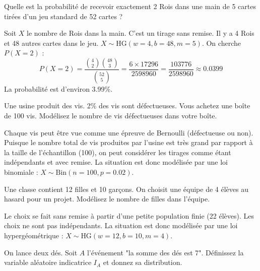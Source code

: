 \begin{exercicebox}
Quelle est la probabilité de recevoir exactement 2 Rois dans une main de 5 cartes tirées d'un jeu standard de 52 cartes ?
\end{exercicebox}

\begin{correctionbox}
Soit $X$ le nombre de Rois dans la main. C'est un tirage sans remise. Il y a 4 Rois et 48 autres cartes dans le jeu. $X \sim \text{HG}(w=4, b=48, m=5)$.
On cherche $P(X=2)$ :
$$ P(X=2) = \frac{\binom{4}{2} \binom{48}{3}}{\binom{52}{5}} = \frac{6 \times 17296}{2598960} = \frac{103776}{2598960} \approx 0.0399 $$
La probabilité est d'environ 3.99\%.
\end{correctionbox}

\begin{exercicebox}
Une usine produit des vis. 2\% des vis sont défectueuses. Vous achetez une boîte de 100 vis. Modélisez le nombre de vis défectueuses dans votre boîte.
\end{exercicebox}

\begin{correctionbox}
Chaque vis peut être vue comme une épreuve de Bernoulli (défectueuse ou non). Puisque le nombre total de vis produites par l'usine est très grand par rapport à la taille de l'échantillon (100), on peut considérer les tirages comme étant indépendants et avec remise. La situation est donc modélisée par une loi binomiale : $X \sim \text{Bin}(n=100, p=0.02)$.
\end{correctionbox}

\begin{exercicebox}
Une classe contient 12 filles et 10 garçons. On choisit une équipe de 4 élèves au hasard pour un projet. Modélisez le nombre de filles dans l'équipe.
\end{exercicebox}

\begin{correctionbox}
Le choix se fait sans remise à partir d'une petite population finie (22 élèves). Les choix ne sont pas indépendants. La situation est donc modélisée par une loi hypergéométrique : $X \sim \text{HG}(w=12, b=10, m=4)$.
\end{correctionbox}

\begin{exercicebox}
On lance deux dés. Soit $A$ l'événement "la somme des dés est 7". Définissez la variable aléatoire indicatrice $I_A$ et donnez sa distribution.
\end{exercicebox}

